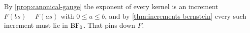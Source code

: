 %
%
%
%
%
%
%

By \ref{prop:canonical-gauge} the exponent of every kernel is an increment
$F(bs) - F(as)$ with $0 \le a \le b$, and by \ref{thm:increments-bernstein} every such
increment must lie in $\mathrm{BF}_0$. That pins down $F$.

